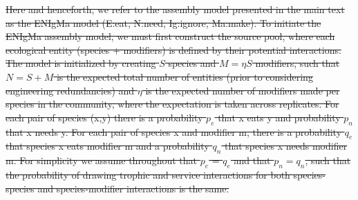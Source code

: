 \documentclass[twocolumn,preprintnumbers,amsmath,amssymb,superscriptaddress,linenumbers]{revtex4-1}
\newcommand{\rr}[1]{{\rm #1}}
\providecommand{\DIFdel}[1]{{\protect\color{red}\sout{#1}}}                      %
\begin{document}
\DIFdel{Here and henceforth, we refer to the assembly model presented in the main text as the ENIgMa model (E:eat, N:need, Ig:ignore, Ma:make).
To initiate the ENIgMa assembly model, we must first construct the source pool, where each ecological entity (species + modifiers) is defined by their potential interactions.
The model is initialized by creating $S$ species and $M = \eta S$ modifiers, such that $N=S+M$ is the expected total number of entities (prior to considering engineering redundancies) and $\eta$ is the expected number of modifiers made per species in the community, where the expectation is taken across replicates.
For each pair of species (x,y) there is a probability $p_e$ that x eats y and probability $p_n$ that x needs y.
For each pair of species x and modifier m, there is a probability $q_e$ that species x eats modifier m and a probability $q_n$ that species x needs modifier m.
For simplicity we assume throughout that $p_e$ = $q_e$ and that $p_n = q_n$, such that the probability of drawing trophic and service interactions for both species-species and species-modifier interactions is the same.
}%
\end{document}

